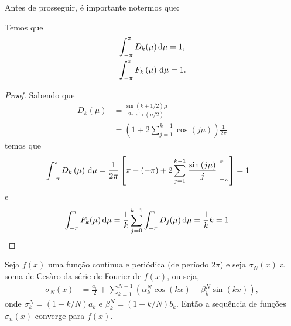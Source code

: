 Antes de prosseguir, \'{e} importante notermos que:
\begin{lem}
    Temos que
    \begin{align*}
        & \int_{-\pi}^\pi D_k(\mu) \, \mathrm{d}\mu = 1, \\
        & \int_{-\pi}^\pi F_k\left( \mu \right) \, \mathrm{d}\mu = 1.
    \end{align*}
\end{lem}
\begin{proof}
    Sabendo que
    \begin{align*}
        D_k(\mu) &= \frac{\sin\left( k + 1/2 \right) \mu}{2 \pi \sin\left( \mu/2 \right)} \\
        &= \left( 1 + 2 \sum_{j = 1}^{k - 1} \cos\left( j \mu \right) \right) \frac{1}{2 \pi}
    \end{align*}
    temos que
    \begin{align*}
        \int_{-\pi}^\pi D_k\left( \mu \right) \, \mathrm{d}\mu &= \frac{1}{2 \pi} \left[ \pi - \left( -\pi \right) + 2 \sum_{j = 1}^{k - 1} \left. \frac{\sin\left( j \mu \right)}{j} \right|_{-\pi}^\pi \right] = 1
    \end{align*}
    e
    \begin{align*}
        \int_{-\pi}^\pi F_k(\mu) \, \mathrm{d}\mu &= \frac{1}{k} \sum_{j = 0}^{k - 1} \int_{-\pi}^\pi D_j(\mu) \, \mathrm{d}\mu = \frac{1}{k} k = 1. \qedhere
    \end{align*}
\end{proof}
\begin{teo}[Fej\'{e}r] \label{teo:fejer}
    Seja $f(x)$ uma fun\c{c}\~{a}o cont\'{i}nua e peri\'{o}dica (de per\'{i}odo $2\pi$) e seja $\sigma_N(x)$ a soma de Ces\`{a}ro da s\'{e}rie de Fourier de $f(x)$, ou seja,
    \begin{align*}
        \sigma_N(x) &= \frac{a_0}{2} + \sum_{k = 1}^{N - 1} \left( \alpha_k^N \cos\left( k x \right) + \beta_k^N \sin\left( k x \right) \right),
    \end{align*}
    onde $\sigma_k^N = \left( 1 - k/N \right) a_k$ e $\beta_k^N = \left( 1 - k/N \right) b_k$. Ent\~{a}o a sequ\^{e}ncia de fun\c{c}\~{o}es $\sigma_n(x)$ converge para $f(x)$.
\end{teo}
